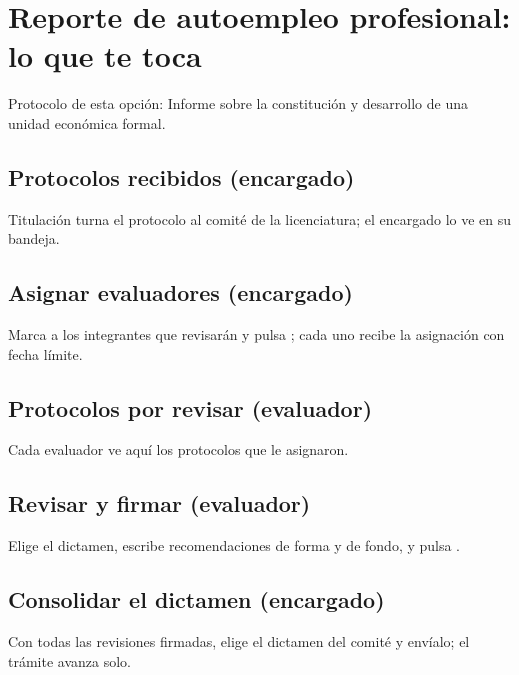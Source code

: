 \section{Reporte de autoempleo profesional: lo que te toca}
Protocolo de esta opción: Informe sobre la constitución y desarrollo de una unidad económica formal.
\subsection{Protocolos recibidos (encargado)}
Titulación turna el protocolo al comité de la licenciatura; el encargado lo ve en su bandeja.
\subsection{Asignar evaluadores (encargado)}
Marca a los integrantes que revisarán y pulsa ; cada uno recibe la asignación con fecha límite.
\subsection{Protocolos por revisar (evaluador)}
Cada evaluador ve aquí los protocolos que le asignaron.
\subsection{Revisar y firmar (evaluador)}
Elige el dictamen, escribe recomendaciones de forma y de fondo, y pulsa .
\subsection{Consolidar el dictamen (encargado)}
Con todas las revisiones firmadas, elige el dictamen del comité y envíalo; el trámite avanza solo.
